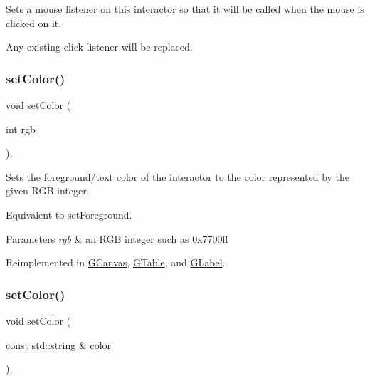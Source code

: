 Sets a mouse listener on this interactor so that it will be called when the mouse is clicked on it. 

Any existing click listener will be replaced. \mbox{\label{classGInteractor_ab1f5cc0f5cc6bbbd716a526c61f1081d}} 
\subsubsection{\texorpdfstring{set\+Color()}{setColor()}\hspace{0.1cm}{\footnotesize\ttfamily [1/2]}}
{\footnotesize\ttfamily void set\+Color (\begin{DoxyParamCaption}\item[{int}]{rgb }\end{DoxyParamCaption})\hspace{0.3cm}{\ttfamily [virtual]}, {\ttfamily [inherited]}}



Sets the foreground/text color of the interactor to the color represented by the given R\+GB integer. 

Equivalent to set\+Foreground. 
\begin{DoxyParams}{Parameters}
{\em rgb} & an R\+GB integer such as 0x7700ff \\
\hline
\end{DoxyParams}


Reimplemented in \mbox{\hyperlink{classGCanvas_af6e1bcf23a09a0ae0607daff81ee45fa}{G\+Canvas}}, \mbox{\hyperlink{classGTable_a165735fb49fa7db12602d32557cbfe0d}{G\+Table}}, and \mbox{\hyperlink{classGLabel_a165735fb49fa7db12602d32557cbfe0d}{G\+Label}}.

\mbox{\label{classGInteractor_a61374df6c11b52cfbb0815decdbaebc6}} 
\subsubsection{\texorpdfstring{set\+Color()}{setColor()}\hspace{0.1cm}{\footnotesize\ttfamily [2/2]}}
{\footnotesize\ttfamily void set\+Color (\begin{DoxyParamCaption}\item[{const std\+::string \&}]{color }\end{DoxyParamCaption})\hspace{0.3cm}{\ttfamily [virtual]}, {\ttfamily [inherited]}}



